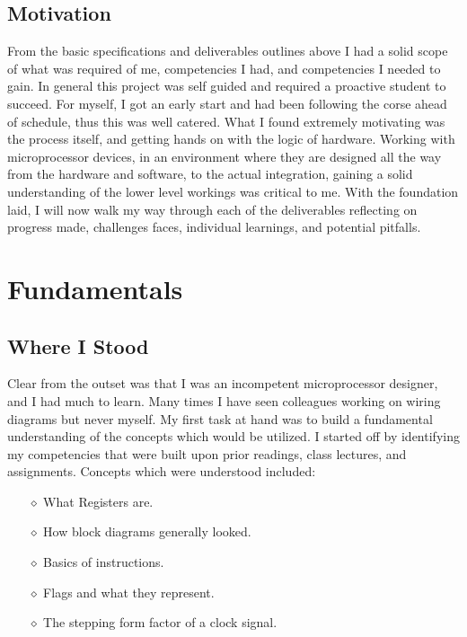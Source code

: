 \documentclass{article}
\begin{document}
\subsection{Motivation}
From the basic specifications and deliverables outlines above I had a solid scope of what was required of me, competencies I had, and competencies I needed to gain. 
In general this project was self guided and required a proactive student to succeed. 
For myself, I got an early start and had been following the corse ahead of schedule, thus this was well catered. 
What I found extremely motivating was the process itself, and getting hands on with the logic of hardware. 
Working with microprocessor devices, in an environment where they are designed all the way from the hardware and software, to the actual integration, gaining a solid understanding of the lower level workings was critical to me. 
With the foundation laid, I will now walk my way through each of the deliverables reflecting on progress made, challenges faces, individual learnings, and potential pitfalls. 

\section{Fundamentals}
\subsection{Where I Stood}
Clear from the outset was that I was an incompetent microprocessor designer, and I had much to learn. 
Many times I have seen colleagues working on wiring diagrams but never myself. 
My first task at hand was to build a fundamental understanding of the concepts which would be utilized. 
I started off by identifying my competencies that were built upon prior readings, class lectures, and assignments. 
Concepts which were understood included:
\begin{itemize}
    \item[\(\diamond\)] What Registers are.
    \item[\(\diamond\)] How block diagrams generally looked.
    \item[\(\diamond\)] Basics of instructions.
    \item[\(\diamond\)] Flags and what they represent.
    \item[\(\diamond\)] The stepping form factor of a clock signal.
\end{itemize}
\end{document}
